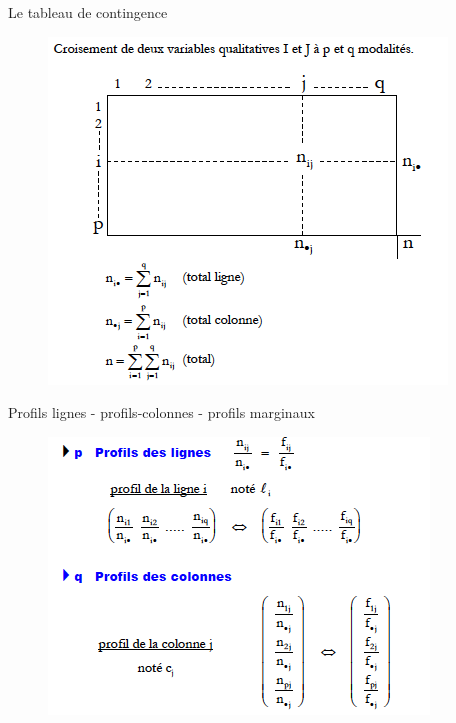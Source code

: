 \documentclass[11pt]{beamer}
\begin{document}




\begin{frame}{Le tableau de contingence}
\begin{figure}
\includegraphics[scale=0.6]{Exemple3.png}  
\end{figure}
\end{frame}

 

 
\begin{frame}{Profils lignes - profils-colonnes - profils
marginaux}
\begin{figure}
\includegraphics[scale=0.7]{exemple9.png}  
\end{figure}
\end{frame}
\end{document}

